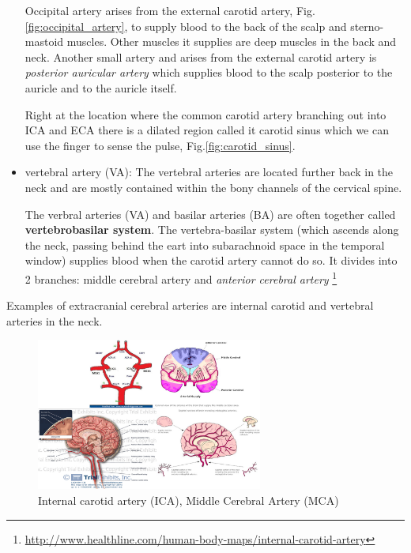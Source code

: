 \begin{itemize}
  Occipital artery arises from the external carotid artery,
  Fig.\ref{fig:occipital_artery}, to supply blood to the back of the scalp and
  sterno-mastoid muscles. Other muscles it supplies are deep muscles in the back
  and neck. Another small artery and arises from the external carotid artery
  is {\it posterior auricular artery} which supplies blood to the scalp
  posterior to the auricle and to the auricle itself.

  Right at the location where the common carotid artery branching out into ICA
  and ECA there is a dilated region called {it carotid sinus} which we can use
  the finger to sense the pulse, Fig.\ref{fig:carotid_sinus}.

  \item vertebral artery (VA): The vertebral arteries are located further back
  in the neck and are mostly contained within the bony channels of the cervical spine.

  The verbral arteries (VA) and basilar arteries (BA) are often together called
  {\bf vertebrobasilar system}. The vertebra-basilar system (which ascends along
  the neck, passing behind the eart into subarachnoid space in the temporal
  window) supplies blood when the carotid artery cannot do so. It
    divides into 2 branches: middle cerebral artery and {\it anterior cerebral
    artery}
    \footnote{\url{http://www.healthline.com/human-body-maps/internal-carotid-artery}}
\end{itemize}

Examples of extracranial cerebral arteries are internal carotid  and vertebral
arteries in the neck.

 \begin{figure}[hbt]
  \centerline{\includegraphics[height=5cm,
    angle=0]{./images/brain_arteries.eps}}
\caption{Internal carotid artery (ICA), Middle Cerebral Artery (MCA)}
\label{fig:brain_arteries}
\end{figure}


